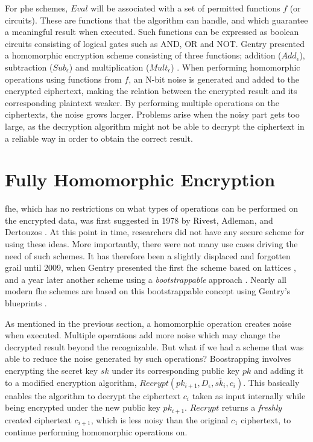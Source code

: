 For \gls{phe} schemes, $Eval$ will be associated with a set of permitted functions $f$ (or circuits). These are functions that the algorithm can handle, and which guarantee a meaningful result when executed. Such functions can be expressed as boolean circuits consisting of logical gates such as AND, OR and NOT. Gentry presented a homomorphic encryption scheme consisting of three functions; addition ($Add_{\epsilon}$), subtraction ($Sub_{\epsilon}$) and multiplication ($Mult_{\epsilon}$) \cite{Gentry_computing_arb_func_enc_data}. When performing homomorphic operations using functions from $f$, an N-bit noise is generated and added to the encrypted ciphertext, making the relation between the encrypted result and its corresponding plaintext weaker. By performing multiple operations on the ciphertexts, the noise grows larger. Problems arise when the noisy part gets too large, as the decryption algorithm might not be able to decrypt the ciphertext in a reliable way in order to obtain the correct result.

\section{Fully Homomorphic Encryption}

\Gls{fhe}, which has no restrictions on what types of operations can be performed on the encrypted data, was first suggested in 1978 by Rivest, Adleman, and Dertouzos \cite{rivest1978data}. At this point in time, researchers did not have any secure scheme for using these ideas. More importantly, there were not many use cases driving the need of such schemes. It has therefore been a slightly displaced and forgotten grail until 2009,
when Gentry presented the first \gls{fhe} scheme based on lattices \cite{Gentry_first_lattices}, and a year later another scheme using a \emph{bootstrappable} approach \citep{Gentry_computing_arb_func_enc_data}. Nearly all modern \gls{fhe} schemes are based on this bootstrappable concept using Gentry's blueprints \cite{vaikun}. 

As mentioned in the previous section, a homomorphic operation creates noise when executed. Multiple operations add more noise which may change the decrypted result beyond the recognizable. But what if we had a scheme that was able to reduce the noise generated by such operations? Boostrapping involves encrypting the secret key $sk$ under its corresponding public key $pk$ and adding it to a modified encryption algorithm, $Recrypt(pk_{i+1}, D_{\epsilon}, \overline{sk_i}, c_i)$. This basically enables the algorithm to decrypt the ciphertext $c_i$ taken as input internally while being encrypted under the new public key $pk_{i+1}$. $Recrypt$ returns a \emph{freshly} created ciphertext $c_{i+1}$, which is less noisy than the original $c_1$ ciphertext, to continue performing homomorphic operations on.

